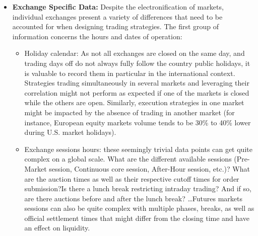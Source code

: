 \begin{itemize}
Maintaining a table of the quotation currency per instrument is also necessary in order to be able to aggregate positions at a portfolio level. Some exchanges allow the quotation of prices in currencies different from the one of the country in which the exchange is located.\footnote{For example, Jardine Matheson Holdings quotes in USD on the Singapore exchange while most of the other securities quote in Singapore Dollars.} Additionally, the Quote Factor associated with the quotation currency data needs to be stored. To account for the wide range of currency values and preserve pricing precision, market data providers might be publishing FX rates with a factor of 100 or 1000. Hence, to convert prices to USD one needs to multiply by the quote factor: usd price $=$ local price $\cdot$ fx $\cdot$ quote factor. Similarly, some exchanges quote prices in cents, and the associated quotation currency is reflected with a small cap letter: GBP/GBp, ZAR/ZAr, ILS/ILs, \dots).


\item \textbf{Exchange Specific Data:}  Despite the electronification of markets, individual exchanges present a variety of differences that need to be accounted for when designing trading strategies. The first group of information concerns the hours and dates of operation:
\begin{itemize}
\item Holiday calendar: As not all exchanges are closed on the same day, and trading days off do not always fully follow the country public holidays, it is valuable to record them in particular in the international context. Strategies trading simultaneously in several markets and leveraging their correlation might not perform as expected if one of the markets is closed while the others are open. Similarly, execution strategies in one market might be impacted by the absence of trading in another market (for instance, European equity markets volume tends to be 30\% to 40\% lower during U.S. market holidays).

\item Exchange sessions hours: these seemingly trivial data points can get quite complex on a global scale. What are the different available sessions (Pre-Market session, Continuous core session, After-Hour session, etc.)? What are the auction times as well as their respective cutoff times for order submission?Is there a lunch break restricting intraday trading? And if so, are there auctions before and after the lunch break? \dots Futures markets sessions can also be quite complex with multiple phases, breaks, as well as official settlement times that might differ from the closing time and have an effect on liquidity.


\end{itemize}
\end{itemize}
